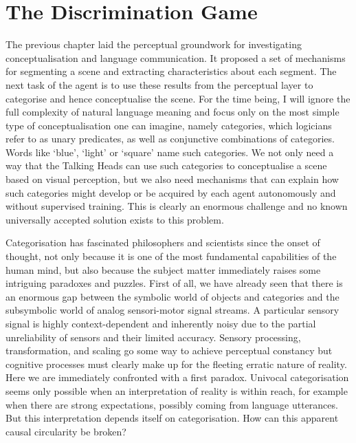 \chapter{The Discrimination Game}
\label{chap:4}

The previous chapter laid the perceptual groundwork 
for investigating conceptualisation and language 
communication. It proposed a set of mechanisms for segmenting a 
scene and extracting characteristics about each 
segment. The next task of the agent is to use these results
from the perceptual layer to categorise 
and hence conceptualise the
scene. For the time being, I will 
ignore the full complexity of natural
language meaning and focus only on the most 
simple type of conceptualisation one can
imagine, namely categories, which logicians refer 
to as unary predicates, as well as conjunctive 
combinations of categories. Words like `blue', `light' or
`square' name such categories. We not only need a way 
that the Talking Heads can use such categories to conceptualise
a scene based on visual perception, but we also need 
mechanisms that can explain how such categories might 
develop or be acquired by each agent autonomously and 
without supervised training. This is clearly an enormous
challenge and no known universally accepted solution 
exists to this problem.

Categorisation has fascinated philosophers and scientists
since the onset of thought, not only because it is one
of the most fundamental capabilities of the human mind, 
but also because the subject matter immediately raises 
some intriguing paradoxes and puzzles. First of all, 
we have already seen that there is an enormous 
gap between the symbolic world of objects and categories
and the subsymbolic world of analog sensori-motor signal streams. 
A particular sensory signal is highly context-dependent and
inherently noisy due to the partial
unreliability of sensors and their limited accuracy. 
Sensory processing, transformation, and scaling 
go some way to achieve perceptual constancy
but cognitive processes must clearly make up for
the fleeting erratic nature of reality. 
Here we are immediately confronted with a first paradox. 
Univocal categorisation seems only possible when 
an interpretation of reality is within reach, for example
when there are strong expectations, possibly coming 
from language utterances. But this interpretation
depends itself on categorisation. How can this apparent
causal circularity be broken? 

